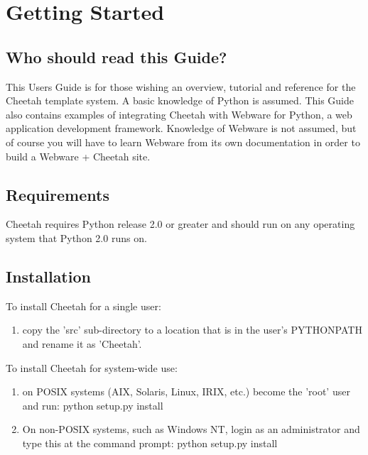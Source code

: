 \section{Getting Started}
\label{gettingStarted}


\subsection{Who should read this Guide?}

This Users Guide is for those wishing an overview, tutorial and reference for
the Cheetah template system.  A basic knowledge of Python is assumed.
This Guide also contains examples of integrating Cheetah with Webware for
Python, a web application development framework.  Knowledge of Webware is not
assumed, but of course you will have to learn Webware from its own 
documentation in order to build a Webware + Cheetah site.

\subsection{Requirements}
\label{gettingStarted.requirements}

Cheetah requires Python release 2.0 or greater and should run on any
operating system that Python 2.0 runs on.

\subsection{Installation}
\label{gettingStarted.install}

To install Cheetah for a single user:
\begin{enumerate}
\item copy the 'src' sub-directory  to a location that is in the user's
     PYTHONPATH and rename it as 'Cheetah'.
\end{enumerate}

To install Cheetah for system-wide use:
\begin{enumerate}
\item on POSIX systems (AIX, Solaris, Linux, IRIX, etc.) become the 'root' user
     and run: python setup.py install
     
\item On non-POSIX systems, such as Windows NT, login as an administrator and
     type this at the command prompt:  python setup.py install
\end{enumerate}


